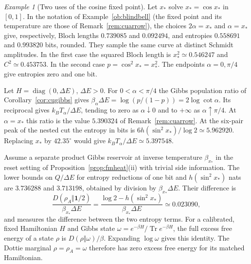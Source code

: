 \documentclass[aps,pra,onecolumn,superscriptaddress,nofootinbib,10pt]{revtex4-2}
\theoremstyle{definition}
\theoremstyle{remark}
\newtheorem{example}[theorem]{Example}
\begin{document}
\begin{example}[Two uses of the cosine fixed point]\label{ob:dottiethermal}
Let \(x_*\) solve \(x_*=\cos x_*\) in \([0,1]\). In the notation of
Example~\ref{ob:blindbell} (the fixed point and its temperature are those of Remark~\ref{rem:cuarrow}), the choices \(2\alpha=x_*\) and
\(\alpha=x_*\) give, respectively, Bloch lengths \(0.739085\) and
\(0.092494\), and entropies \(0.558691\) and \(0.993820\) bits, rounded.
They sample the same curve at distinct Schmidt amplitudes. In the first
case the squared Bloch length is \(x_*^2\simeq0.546247\) and
\(C^2\simeq0.453753\). In the second case \(p=\cos^2x_*=x_*^2\).
The endpoints \(\alpha=0,\pi/4\) give entropies zero and one bit.

Let \(H=\operatorname{diag}(0,\Delta E)\), \(\Delta E>0\).
For \(0<\alpha<\pi/4\) the Gibbs population ratio of
Corollary~\ref{cor:cugibbs} gives
\(\beta_\alpha\Delta E=\log(p/(1-p))=2\log\cot\alpha\).
Its reciprocal gives \(k_BT_\alpha/\Delta E\), tending to
zero as \(\alpha\downarrow0\) and to \(+\infty\) as
\(\alpha\uparrow\pi/4\). At \(\alpha=x_*\) this ratio is
the value \(5.390324\) of Remark~\ref{rem:cuarrow}. At the six-pair peak of the nested cut the entropy in bits is
\(6h(\sin^2x_*)/\log2\simeq5.962920\). Replacing \(x_*\) by \(42.35^\circ\)
would give \(k_BT_\alpha/\Delta E\simeq5.397548\).

Assume a separate product Gibbs reservoir at inverse temperature
\(\beta_{x_*}\) in the reset setting of Proposition~\ref{prop:fmheat}(ii) with trivial side information.
The lower bounds on \(Q/\Delta E\) for entropy reductions of one bit
and \(h(\sin^2x_*)\) nats are \(3.736288\) and \(3.713198\),
obtained by division by \(\beta_{x_*}\Delta E\).
Their difference is
\[
 \frac{D(\rho_A\Vert\mathbf1/2)}{\beta_{x_*}\Delta E}
   =\frac{\log2-h(\sin^2x_*)}{\beta_{x_*}\Delta E}
   \simeq 0.023090,
\]
and measures the difference between the two entropy terms.
For a calibrated, fixed Hamiltonian \(H\) and Gibbs state
\(\omega=e^{-\beta H}/\operatorname{Tr}e^{-\beta H}\),
the full excess free energy of a state \(\rho\) is
\(D(\rho\Vert\omega)/\beta\). Expanding \(\log\omega\) gives this
identity. The Dottie marginal \(\rho=\rho_A=\omega\) therefore
has zero excess free energy for its matched Hamiltonian.
\end{example}
\end{document}

